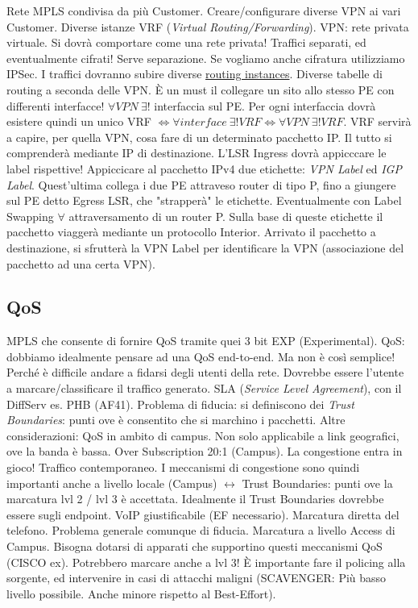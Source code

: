 Rete MPLS condivisa da più Customer. Creare/configurare diverse VPN ai vari Customer. Diverse istanze VRF (\textit{Virtual Routing/Forwarding}). VPN: rete privata virtuale. Si dovrà comportare come una rete privata! Traffici separati, ed eventualmente cifrati! Serve separazione. Se vogliamo anche cifratura utilizziamo IPSec. I traffici dovranno subire diverse \underline{routing instances}. Diverse tabelle di routing a seconda delle VPN. \`E un must il collegare un sito allo stesso PE con differenti interfacce! $\forall VPN\ \exists!$ interfaccia sul PE. Per ogni interfaccia dovrà esistere quindi un unico VRF $\iff \forall interface\ \exists! VRF \iff \forall VPN\ \exists!VRF$. VRF servirà a capire, per quella VPN, cosa fare di un determinato pacchetto IP. Il tutto si comprenderà mediante IP di destinazione. L'LSR Ingress dovrà appicccare le label rispettive! Appiccicare al pacchetto IPv4 due etichette: \textit{VPN Label} ed \textit{IGP Label}. Quest'ultima collega i due PE attraveso router di tipo P, fino a giungere sul PE detto Egress LSR, che "strapperà" le etichette. Eventualmente con Label Swapping $\forall$ attraversamento di un router P. Sulla base di queste etichette il pacchetto viaggerà mediante un protocollo Interior. Arrivato il pacchetto a destinazione, si sfrutterà la VPN Label per identificare la VPN (associazione del pacchetto ad una certa VPN).

\subsection{QoS}

MPLS che consente di fornire QoS tramite quei 3 bit EXP (Experimental). QoS: dobbiamo idealmente pensare ad una QoS end-to-end. Ma non è così semplice! Perché è difficile andare a fidarsi degli utenti della rete. Dovrebbe essere l'utente a marcare/classificare il traffico generato. SLA (\textit{Service Level Agreement}), con il DiffServ es. PHB (AF41). Problema di fiducia: si definiscono dei \textit{Trust Boundaries}: punti ove è consentito che si marchino i pacchetti. Altre considerazioni: QoS in ambito di campus. Non solo applicabile a link geografici, ove la banda è bassa. Over Subscription 20:1 (Campus). La congestione entra in gioco! Traffico contemporaneo. I meccanismi di congestione sono quindi importanti anche a livello locale (Campus) $\leftrightarrow$ Trust Boundaries: punti ove la marcatura lvl 2 / lvl 3 è accettata. Idealmente il Trust Boundaries dovrebbe essere sugli endpoint. VoIP giustificabile (EF necessario). Marcatura diretta del telefono. Problema generale comunque di fiducia. Marcatura a livello Access di Campus. Bisogna dotarsi di apparati che supportino questi meccanismi QoS (CISCO ex). Potrebbero marcare anche a lvl 3! \`E importante fare il policing alla sorgente, ed intervenire in casi di attacchi maligni (SCAVENGER: Più basso livello possibile. Anche minore rispetto al Best-Effort).

